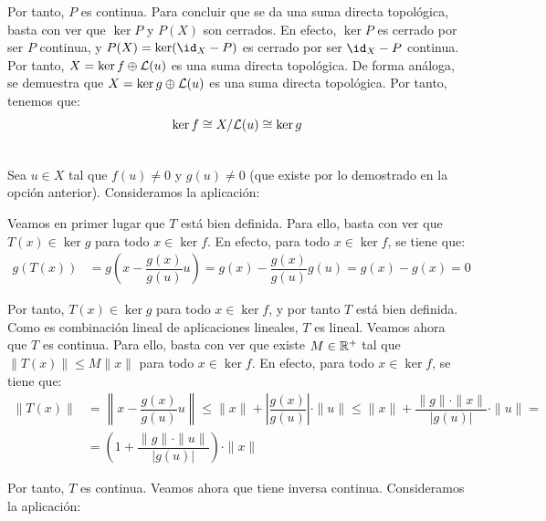 \begin{ejercicio}
\begin{description}
    Por tanto, $P$ es continua. Para concluir que se da una suma directa topológica, basta con ver que $\ker P$ y $P(X)$ son cerrados. En efecto, $\ker P$ es cerrado por ser $P$ continua, y $P(X)=\ker(\id_X - P)$ es cerrado por ser $\id_X - P$ continua. Por tanto, $X = \ker f \oplus \mathcal{L}(u)$ es una suma directa topológica. De forma análoga, se demuestra que $X = \ker g \oplus \mathcal{L}(u)$ es una suma directa topológica. Por tanto, tenemos que:
    \begin{equation*}
        \ker f \cong X / \mathcal{L}(u) \cong \ker g
    \end{equation*}

    \item[Opción 2: Dando el isomorfismo]~\\
    Sea $u \in X$ tal que $f(u) \neq 0$ y $g(u) \neq 0$ (que existe por lo demostrado en la opción anterior). Consideramos la aplicación:

    Veamos en primer lugar que $T$ está bien definida. Para ello, basta con ver que $T(x) \in \ker g$ para todo $x \in \ker f$. En efecto, para todo $x \in \ker f$, se tiene que:
    \begin{align*}
        g(T(x)) &= g\left(x - \dfrac{g(x)}{g(u)} u\right) = g(x) - \dfrac{g(x)}{g(u)} g(u) = g(x) - g(x) = 0
    \end{align*}

    Por tanto, $T(x) \in \ker g$ para todo $x \in \ker f$, y por tanto $T$ está bien definida. Como es combinación lineal de aplicaciones lineales, $T$ es lineal. Veamos ahora que $T$ es continua. Para ello, basta con ver que existe $M \in \mathbb{R}^+$ tal que $\|T(x)\| \leq M \|x\|$ para todo $x \in \ker f$. En efecto, para todo $x \in \ker f$, se tiene que:
    \begin{align*}
        \|T(x)\| &= \left\|x - \dfrac{g(x)}{g(u)} u\right\| \leq \|x\| + \left|\dfrac{g(x)}{g(u)}\right| \cdot \|u\| \leq \|x\| + \dfrac{\|g\| \cdot \|x\|}{|g(u)|} \cdot \|u\| =\\&= \left(1 + \dfrac{\|g\| \cdot \|u\|}{|g(u)|}\right) \cdot \|x\|
    \end{align*}

    Por tanto, $T$ es continua. Veamos ahora que tiene inversa continua. Consideramos la aplicación:


\end{description}
\end{ejercicio}
